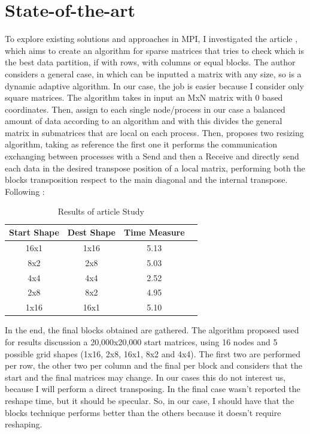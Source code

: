 \section{State-of-the-art}
To explore existing solutions and approaches in MPI, I investigated the article \cite{2D-Transpose-Methods}, which aims to create an algorithm for sparse matrices that tries to check which is the best data partition, if with rows, with columns or equal blocks.
The author considers a general case, in which can be inputted a matrix with any size, so is a dynamic adaptive algorithm. In our case, the job is easier because I consider only square matrices. 
The algorithm takes in input an MxN matrix with 0 based coordinates. Then, assign to each single node/process in our case a balanced amount of data according to an algorithm and with this divides the general matrix in submatrices that are local on each process. Then, proposes two resizing algorithm, taking as reference the first one it performs the communication exchanging between processes with a Send and then a Receive and directly send each data in the desired transpose position of a local matrix, performing both the blocks transposition respect to the main diagonal and the internal transpose.
Following \cite{Table_Results}:
\begin{table}[!ht]
    \centering
    \begin{tabular}{|c|c|c|c|}
        \hline
        Start Shape & Dest Shape & Time Measure \\
        \hline
        16x1 & 1x16 & 5.13\\
        8x2 & 2x8 & 5.03\\
        4x4 & 4x4 & 2.52\\
        2x8 & 8x2 & 4.95\\
        1x16 & 16x1 & 5.10\\
        \hline
    \end{tabular}
    \caption{Results of article \cite{Table_Results} Study}
\end{table}
In the end, the final blocks obtained are gathered. The algorithm proposed used for results discussion a 20,000x20,000 start matrices, using 16 nodes and 5 possible grid shapes (1x16, 2x8, 16x1, 8x2 and 4x4). The first two are performed per row, the other two per column and the final per block and considers that the start and the final matrices may change. In our cases this do not interest us, because I will perform a direct transposing.
In the final case wasn't reported the reshape time, but it should be specular. So, in our case, I should have that the blocks technique performs better than the others because it doesn't require reshaping.
